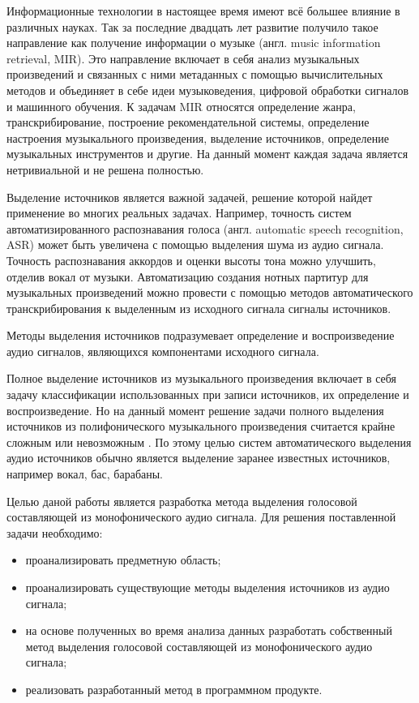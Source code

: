 \Introduction

Информационные технологии в настоящее время имеют всё большее влияние в различных науках. Так за последние двадцать лет развитие получило такое направление как получение информации о музыке (англ. music information retrieval, MIR)\cite{MIR}. Это направление включает в себя анализ музыкальных произведений и связанных с ними метаданных с помощью вычислительных методов и объединяет в себе идеи музыковедения, цифровой обработки сигналов и
машинного обучения. К задачам MIR относятся определение жанра, транскрибирование, построение рекомендательной системы, определение настроения музыкального произведения, выделение источников, определение музыкальных инструментов и другие. На данный момент каждая задача является нетривиальной и не решена полностью\cite{Downie}.

Выделение источников является важной задачей, решение которой найдет применение во многих реальных задачах. Например, точность систем автоматизированного распознавания голоса (англ. automatic speech recognition, ASR) может быть увеличена с помощью выделения шума из аудио сигнала\cite{Maas}. Точность распознавания аккордов и оценки высоты тона можно улучшить, отделив вокал от музыки\cite{[Huang}. Автоматизацию создания нотных партитур для музыкальных произведений можно провести с помощью методов автоматического транскрибирования к выделенным из исходного сигнала сигналы источников.

Методы выделения источников подразумевает определение и воспроизведение аудио сигналов, являющихся компонентами исходного сигнала.

Полное выделение источников из музыкального произведения включает в себя задачу классификации использованных при записи источников, их определение и воспроизведение. Но на данный момент решение задачи полного выделения источников из полифонического музыкального произведения считается крайне сложным или невозможным \cite{Hsu}. По этому целью систем автоматического выделения аудио источников обычно является выделение заранее известных источников, например вокал, бас, барабаны.

Целью даной работы является разработка метода выделения голосовой составляющей из монофонического аудио сигнала. Для решения поставленной задачи необходимо:

\begin{itemize}
	\item проанализировать предметную область;
	\item проанализировать существующие методы выделения источников из аудио сигнала;
	\item на основе полученных во время анализа данных разработать собственный метод выделения голосовой составляющей из монофонического аудио сигнала;
	\item реализовать разработанный метод в программном продукте.
\end{itemize}